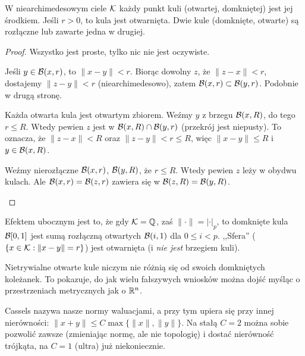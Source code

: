 \begin{fakt}
	W niearchimedesowym ciele $\mathcal K$ każdy punkt kuli (otwartej, domkniętej) jest jej środkiem.
	Jeśli $r > 0$, to kula jest otwarnięta.
	Dwie kule (domknięte, otwarte) są rozłączne lub zawarte jedna w drugiej.
\end{fakt}

\begin{proof}
	Wszystko jest proste, tylko nic nie jest oczywiste.
	\begin{enumx}
		\item Jeśli $y \in \mathcal B(x, r)$, to $\|x-y\| < r$.
		Biorąc dowolny $z$, że $\|z-x\| < r$, dostajemy $\|z-y\| < r$ (niearchimedesowo), zatem $\mathcal B(x,r) \subset \mathcal B(y,r)$.
		Podobnie w drugą stronę.
		\item Każda otwarta kula jest otwartym zbiorem.
		Weźmy $y$ z brzegu $\mathcal B(x,R)$, do tego $r \le R$.
		Wtedy pewien $z$ jest w $\mathcal B(x,R) \cap \mathcal B(y,r)$ (przekrój jest niepusty).
		To oznacza, że $\|z-x\| < R$ oraz $\|z - y\| < r \le R$, więc $\|x-y\| \le R$ i $y \in \mathcal B(x,R)$.
		\item Weźmy nierozłączne $\mathcal B(x,r)$, $\mathcal B(y,R)$, że $r \le R$.
		Wtedy pewien $z$ leży w obydwu kulach.
		Ale $\mathcal B(x,r) = \mathcal B(z,r)$ zawiera się w $\mathcal B(z,R) = \mathcal B(y,R)$. \qedhere
	\end{enumx}
\end{proof}

Efektem ubocznym jest to, że gdy $\mathcal K = \mathbb Q$, zaś $\|\cdot\| = |\cdot|_p$, to domknięte kula $\mathcal B [0,1]$ jest sumą rozłączną otwartych $\mathcal B (i, 1)$ dla $0 \le i < p$.
,,Sfera'' ($\{x \in \mathcal K : \|x-y\| = r\}$) jest otwarnięta (i \emph{nie jest} brzegiem kuli).

Nietrywialne otwarte kule niczym nie różnią się od swoich domkniętych koleżanek.
To pokazuje, do jak wielu fałszywych wniosków można dojść myśląc o przestrzeniach metrycznych jak o $\mathbb R^n$.

Cassels nazywa nasze normy waluacjami, a przy tym upiera się przy innej nierówności:
$\|x+y\| \le C \max \{\|x\|, \|y\|\}$.
Na stałą $C = 2$ można sobie pozwolić zawsze (zmieniając normę, ale nie topologię) i dostać nierówność trójkąta, na $C= 1$ (ultra) już niekoniecznie.